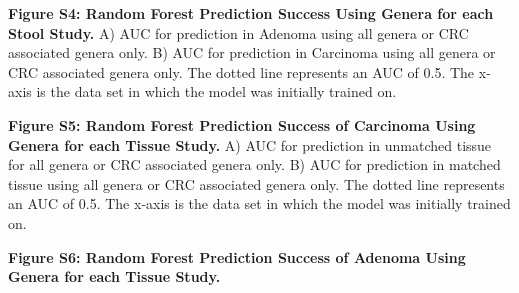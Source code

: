 \documentclass[12pt,]{article}
\begin{document}
\textbf{Figure S4: Random Forest Prediction Success Using Genera for
each Stool Study.} A) AUC for prediction in Adenoma using all genera or
CRC associated genera only. B) AUC for prediction in Carcinoma using all
genera or CRC associated genera only. The dotted line represents an AUC
of 0.5. The x-axis is the data set in which the model was initially
trained on.

\textbf{Figure S5: Random Forest Prediction Success of Carcinoma Using
Genera for each Tissue Study.} A) AUC for prediction in unmatched tissue
for all genera or CRC associated genera only. B) AUC for prediction in
matched tissue using all genera or CRC associated genera only. The
dotted line represents an AUC of 0.5. The x-axis is the data set in
which the model was initially trained on.

\textbf{Figure S6: Random Forest Prediction Success of Adenoma Using
Genera for each Tissue Study.}

\newpage
\end{document}
